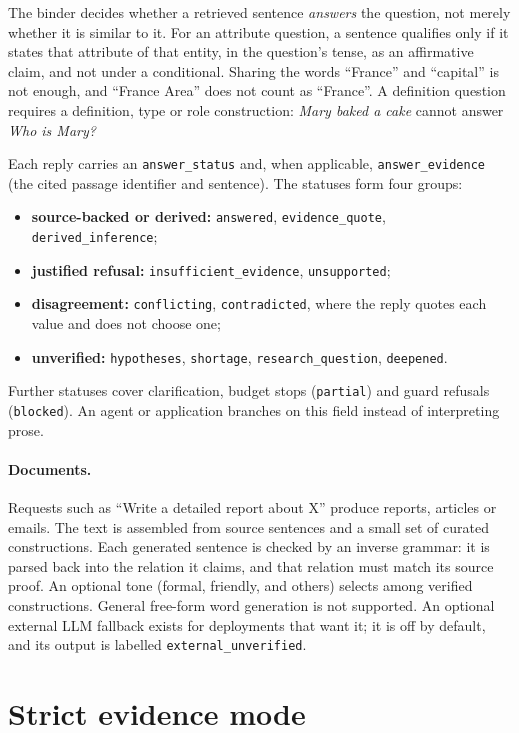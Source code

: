 \documentclass[11pt]{article}
\begin{document}
The binder decides whether a retrieved sentence \emph{answers} the question, not merely whether it is similar to
it. For an attribute question, a sentence qualifies only if it states that attribute of that entity, in the
question's tense, as an affirmative claim, and not under a conditional. Sharing the words ``France'' and
``capital'' is not enough, and ``France Area'' does not count as ``France''. A definition question requires a
definition, type or role construction: \emph{Mary baked a cake} cannot answer \emph{Who is Mary?}

Each reply carries an \texttt{answer\_status} and, when applicable, \texttt{answer\_evidence} (the cited passage
identifier and sentence). The statuses form four groups:
\begin{itemize}
  \item \textbf{source-backed or derived:} \texttt{answered}, \texttt{evidence\_quote}, \texttt{derived\_inference};
  \item \textbf{justified refusal:} \texttt{insufficient\_evidence}, \texttt{unsupported};
  \item \textbf{disagreement:} \texttt{conflicting}, \texttt{contradicted}, where the reply quotes each value
        and does not choose one;
  \item \textbf{unverified:} \texttt{hypotheses}, \texttt{shortage}, \texttt{research\_question},
        \texttt{deepened}.
\end{itemize}
Further statuses cover clarification, budget stops (\texttt{partial}) and guard refusals (\texttt{blocked}). An
agent or application branches on this field instead of interpreting prose.

\paragraph{Documents.} Requests such as ``Write a detailed report about X'' produce reports, articles or emails.
The text is assembled from source sentences and a small set of curated constructions. Each generated sentence is
checked by an inverse grammar: it is parsed back into the relation it claims, and that relation must match its
source proof. An optional tone (formal, friendly, and others) selects among verified constructions. General
free-form word generation is not supported. An optional external LLM fallback exists for deployments that want
it; it is off by default, and its output is labelled \texttt{external\_unverified}.

\section{Strict evidence mode}
\label{sec:strict}
\end{document}

